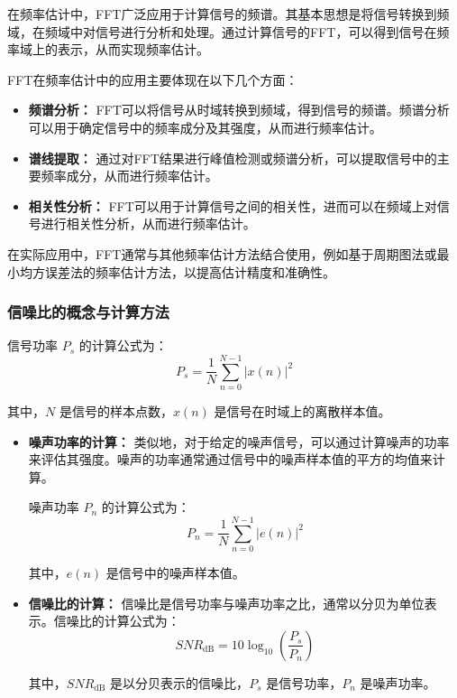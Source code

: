 \documentclass[a4paper,12pt]{article}
\begin{document}
在频率估计中，FFT广泛应用于计算信号的频谱。其基本思想是将信号转换到频域，在频域中对信号进行分析和处理。通过计算信号的FFT，可以得到信号在频率域上的表示，从而实现频率估计。

FFT在频率估计中的应用主要体现在以下几个方面：
\begin{itemize}
    \item \textbf{频谱分析：} FFT可以将信号从时域转换到频域，得到信号的频谱。频谱分析可以用于确定信号中的频率成分及其强度，从而进行频率估计。
    \item \textbf{谱线提取：} 通过对FFT结果进行峰值检测或频谱分析，可以提取信号中的主要频率成分，从而进行频率估计。
    \item \textbf{相关性分析：} FFT可以用于计算信号之间的相关性，进而可以在频域上对信号进行相关性分析，从而进行频率估计。
\end{itemize}

在实际应用中，FFT通常与其他频率估计方法结合使用，例如基于周期图法或最小均方误差法的频率估计方法，以提高估计精度和准确性。

\subsubsection{信噪比的概念与计算方法}
信号功率 $P_s$ 的计算公式为： 
\[ P_s = \frac{1}{N} \sum_{n=0}^{N-1} |x(n)|^2 \]

其中，$N$ 是信号的样本点数，$x(n)$ 是信号在时域上的离散样本值。
\begin{itemize}
    \item \textbf{噪声功率的计算：} 类似地，对于给定的噪声信号，可以通过计算噪声的功率来评估其强度。噪声的功率通常通过信号中的噪声样本值的平方的均值来计算。

    噪声功率 $P_n$ 的计算公式为： 
\[ P_n = \frac{1}{N} \sum_{n=0}^{N-1} |e(n)|^2 \]

其中，$e(n)$ 是信号中的噪声样本值。

    \item \textbf{信噪比的计算：} 信噪比是信号功率与噪声功率之比，通常以分贝为单位表示。信噪比的计算公式为：
    \begin{equation}
        SNR_{\text{dB}} = 10 \log_{10} \left( \frac{P_s}{P_n} \right)
    \end{equation}

其中，$SNR_{\text{dB}}$ 是以分贝表示的信噪比，$P_s$ 是信号功率，$P_n$ 是噪声功率。
\end{itemize}
\end{document}
